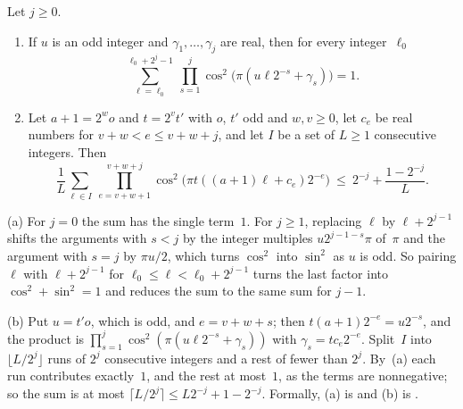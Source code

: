 \begin{lemma}\label{lem:S-progression}
Let $j\ge0$.
\begin{enumerate}[label=(\alph*)]
\item If $u$ is an odd integer and $\gamma_1,\dots,\gamma_j$ are real, then for every integer~$\ell_0$
  \[
    \sum_{\ell=\ell_0}^{\ell_0+2^j-1}\ \prod_{s=1}^j\cos^2\bigl(\pi(u\ell2^{-s}+\gamma_s)\bigr)=1.
  \]
\item Let $a+1=2^wo$ and $t=2^vt'$ with $o$, $t'$ odd and $w,v\ge0$, let $c_e$ be real numbers for $v+w<e\le v+w+j$, and
  let $I$ be a set of $L\ge1$ consecutive integers. Then
  \[
    \frac1L\sum_{\ell\in I}\ \prod_{e=v+w+1}^{v+w+j}\cos^2\bigl(\pi t((a+1)\ell+c_e)2^{-e}\bigr)\ \le\ 2^{-j}+\frac{1-2^{-j}}L.
  \]
\end{enumerate}
\end{lemma}

\begin{outline}
(a) For $j=0$ the sum has the single term~$1$. For $j\ge1$, replacing $\ell$ by $\ell+2^{j-1}$ shifts the arguments with
$s<j$ by the integer multiples $u2^{j-1-s}\pi$ of~$\pi$ and the argument with $s=j$ by $\pi u/2$, which turns $\cos^2$ into
$\sin^2$ as $u$ is odd. So pairing $\ell$ with $\ell+2^{j-1}$ for $\ell_0\le\ell<\ell_0+2^{j-1}$ turns the last factor
into $\cos^2+\sin^2=1$ and reduces the sum to the same sum for $j-1$.

(b) Put $u=t'o$, which is odd, and $e=v+w+s$; then $t(a+1)2^{-e}=u2^{-s}$, and the product is
$\prod_{s=1}^j\cos^2(\pi(u\ell2^{-s}+\gamma_s))$ with $\gamma_s=tc_e2^{-e}$. Split~$I$ into $\lfloor L/2^j\rfloor$ runs of
$2^j$ consecutive integers and a rest of fewer than $2^j$. By~(a) each run contributes exactly~$1$, and the rest at
most~$1$, as the terms are nonnegative; so the sum is at most $\lceil L/2^j\rceil\le L2^{-j}+1-2^{-j}$.
Formally, (a) is  and (b) is .
\end{outline}


